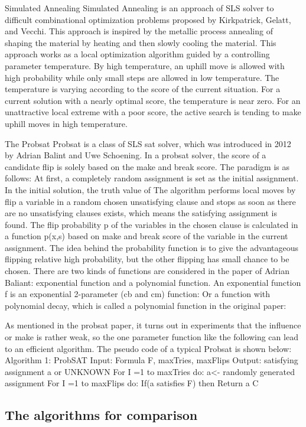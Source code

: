 \documentclass[12pt,a4paper,twoside]{scrartcl}
\numberwithin{equation}{section}
\begin{document}
Simulated Annealing
Simulated Annealing is an approach of SLS solver to difficult combinational optimization problems proposed by Kirkpatrick, Gelatt, and Vecchi. This approach is inspired by the metallic process annealing of shaping the material by heating and then slowly cooling the material. This approach works as a local optimization algorithm guided by a controlling parameter temperature. By high temperature, an uphill move is allowed with high probability while only small steps are allowed in low temperature. The temperature is varying according to the score of the current situation.  For a current solution with a nearly optimal score, the temperature is near zero. For an unattractive local extreme with a poor score, the active search is tending to make uphill moves in high temperature.


The Probsat
Probsat is a class of SLS sat solver, which was introduced in 2012 by Adrian Balint and Uwe Schoening. In a probsat solver, the score of a candidate flip is solely based on the make and break score. The paradigm is as follows: At first, a completely random assignment is set as the initial assignment. In the initial solution, the truth value of The algorithm performs local moves by flip a variable in a random chosen unsatisfying clause and stops as soon as there are no unsatisfying clauses exists, which means the satisfying assignment is found. The flip probability p of the variables in the chosen clause is calculated in a function p(x,s) based on make and break score of the variable in the current assignment. The idea behind the probability function is to give the advantageous flipping relative high probability, but the other flipping has small chance to be chosen.  There are two kinds of functions are considered in the paper of Adrian Baliant: exponential function and a polynomial function. 
 An exponential function f is an exponential 2-parameter (cb and cm) function:
Or a function with polynomial decay, which is called a polynomial function in the original paper: 

As mentioned in the probsat paper, it turns out in experiments that the influence or make is rather weak, so the one parameter function like the following can lead to an efficient algorithm.
The pseudo code of a typical Probsat is shown below:
Algorithm 1: ProbSAT
Input: Formula F, maxTries, maxFlips
Output: satisfying assignment a or UNKNOWN
For I =1 to  maxTries do:
 a<- randomly generated assignment
 For I =1 to maxFlips do:
If(a satisfies  F) then 
Return a
C 
\subsection{The algorithms for comparison} %
\end{document}
